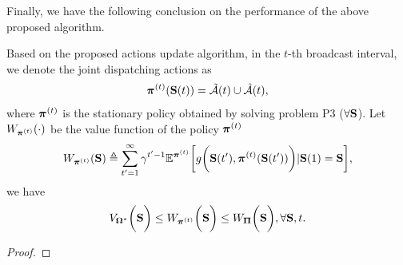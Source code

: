Finally, we have the following conclusion on the performance of the above proposed algorithm.

\begin{lemma}
    \label{lemma:perform}
    Based on the proposed actions update algorithm, in the $t$-th broadcast interval, we denote the joint dispatching actions as
    \begin{align}
        \boldsymbol{\pi}^{(t)}(\mathbf{S}(t)) = \tilde{\mathcal{A}}(t) \cup \hat{\mathcal{A}}(t),
    \end{align}
    where $\boldsymbol{\pi}^{(t)}$ is the stationary policy obtained by solving problem P3 ($\forall \mathbf{S}$).
    Let $W_{\boldsymbol{\pi}^{(t)}}(\cdot)$ be the value function of the policy $\boldsymbol{\pi}^{(t)}$
    \begin{align}
        W_{\boldsymbol{\pi}^{(t)}}(\mathbf{S}) \triangleq
        \sum_{t'=1}^{\infty} \gamma^{t'-1} \mathbb{E}^{ \boldsymbol{\pi}^{(t)} } \bigg[
            g\bigg(\mathbf{S}(t'), \boldsymbol{\pi}^{(t)}(\mathbf{S}(t'))\bigg) | \mathbf{S}(1)=\mathbf{S}
        \bigg],
    \end{align}
    we have
    \begin{align}
        V_{\boldsymbol{\Omega}^*}\bigg(\mathbf{S}\bigg)
        \leq W_{\boldsymbol{\pi}^{(t)}}\bigg(\mathbf{S}\bigg)
        \leq W_{\boldsymbol{\Pi}}\bigg(\mathbf{S}\bigg),
        \forall \mathbf{S},t.
    \end{align}
\end{lemma}
\begin{proof}
\end{proof}

